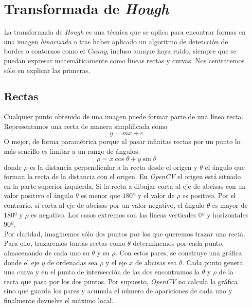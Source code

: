 \section{Transformada de \emph{Hough}}\label{tecnica:hough}
La transformada de \emph{Hough} es una técnica que se aplica para
encontrar formas en una imagen \emph{binarizada} o tras haber aplicado
un algoritmo de detetcción de bordes o contornos como el \emph{Canny},
incluso aunque haya ruido, siempre que se puedan expresar
matemáticamente como líneas rectas y curvas. Nos centraremos sólo en
explicar las primeras.
\subsection{Rectas}
Cualquier punto obtenido de una imagen puede formar parte de una línea
recta. Representamos una recta de manera simplificada como
\begin{equation*}
  y = mx + c
\end{equation*}
O mejor, de forma paramétrica porque al pasar infinitas rectas por un
punto lo más sencillo es limitar a un rango de ángulos.
\begin{equation*}
  \rho = x \cos \theta + y \sin \theta
\end{equation*}
donde $\rho$ es la distancia perpendicular a la recta desde el origen
y $\theta$ el ángulo que forman la recta de la distancia con el
origen. En \emph{OpenCV} el origen está situado en la parte superior
izquierda. Si la recta a dibujar corta al eje de abcisas con un valor
positivo el ángulo $\theta$ es menor que $180º$ y el valor de $\rho$
es positivo. Por el contrario, si corta al eje de abcisas por un valor
negativo, el ángulo $\theta$ es mayor de $180º$ y $\rho$ es
negativo. Los casos extremos son las líneas verticales $0º$ y
horizontales $90º$.\\
Por claridad, imaginemos sólo dos puntos por los que queremos trazar
una recta. Para ello, trazaremos tantas rectas como $\theta$
determinemos por cada punto, almacenando de cada uno su $\theta$ y su
$\rho$. Con estos pares, se construye una gráfica donde el eje $y$ de
ordenadas sea $\rho$ y el eje $x$ de abcisas sea $\theta$. Cada punto
genera una curva y en el punto de intersección de las dos encontramos
la $\theta$ y $\rho$ de la recta que pasa por los dos puntos. Por
supuesto, \emph{OpenCV} no calcula la gráfica sino que guarda los
pares y acumula el número de apariciones de cada uno y finalmente
devuelve el máximo local.

